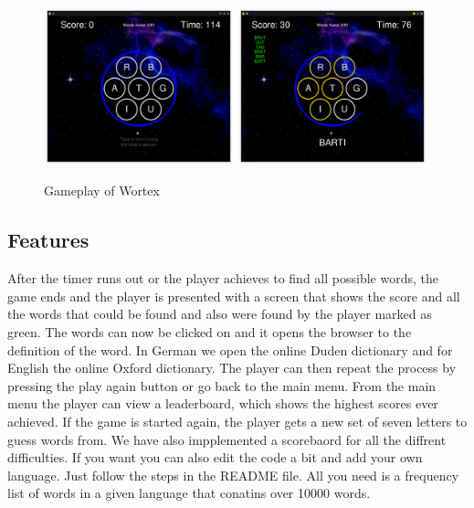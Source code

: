\documentclass{article}[12pt]
\begin{document}
    
    \begin{figure}[ht]
        \includegraphics[width=0.49\textwidth]{pictures/gameplay.png}
        \includegraphics[width=0.49\textwidth]{pictures/mid_game.png}
        \caption{Gameplay of Wortex}
    \end{figure}

    \subsection*{Features}
    
    After the timer runs out or the player achieves to find all possible words,
    the game ends and the player is presented with a screen that shows the
    score and all the words that could be found and also were found by the
    player marked as green. The words can now be clicked on and it opens the
    browser to the definition of the word. In German we open the online Duden
    dictionary and for English the online Oxford dictionary. The player can
    then repeat the process by pressing the play again button or go back to the
    main menu. From the main menu the player can view a leaderboard, which
    shows the highest scores ever achieved. If the game is started again, the
    player gets a new set of seven letters to guess words from.
    We have also impplemented a scorebaord for all the diffrent difficulties.
    If you want you can also edit the code a bit and add your own language. Just
    follow the steps in the README file. All you need is a frequency list of
    words in a given language that conatins over 10000 words.
\end{document}
